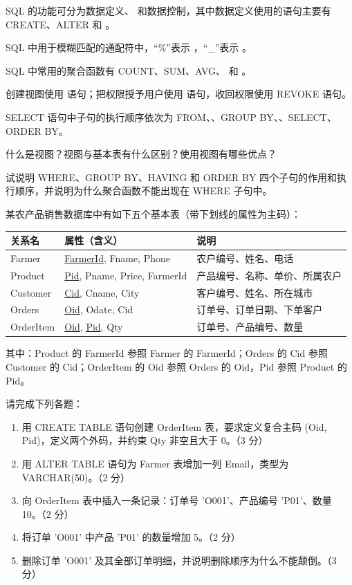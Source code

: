 \documentclass[a4paper,11pt]{article}
\begin{document}
\q SQL 的功能可分为数据定义、\fillblank{} 和数据控制，其中数据定义使用的语句主要有 CREATE、ALTER 和 \fillblank{}。

\q SQL 中用于模糊匹配的通配符中，“\%”表示 \fillblank{}，“\_”表示 \fillblank{}。

\q SQL 中常用的聚合函数有 COUNT、SUM、AVG、\fillblank{} 和 \fillblank{}。

\q 创建视图使用 \fillblank{} 语句；把权限授予用户使用 \fillblank{} 语句，收回权限使用 REVOKE 语句。

\q SELECT 语句中子句的执行顺序依次为 FROM、\fillblank{}、GROUP BY、\fillblank{}、SELECT、ORDER BY。

\q 什么是视图？视图与基本表有什么区别？使用视图有哪些优点？\anslines{2.2cm}

\q 试说明 WHERE、GROUP BY、HAVING 和 ORDER BY 四个子句的作用和执行顺序，并说明为什么聚合函数不能出现在 WHERE 子句中。\anslines{2.2cm}

\q 某农产品销售数据库中有如下五个基本表（带下划线的属性为主码）：
\begin{center}
\small
\begin{tabular}{@{}lll@{}}
\toprule
关系名 & 属性（含义） & 说明 \\
\midrule
Farmer & \underline{FarmerId}, Fname, Phone & 农户编号、姓名、电话 \\
Product & \underline{Pid}, Pname, Price, FarmerId & 产品编号、名称、单价、所属农户 \\
Customer & \underline{Cid}, Cname, City & 客户编号、姓名、所在城市 \\
Orders & \underline{Oid}, Odate, Cid & 订单号、订单日期、下单客户 \\
OrderItem & \underline{Oid}, \underline{Pid}, Qty & 订单号、产品编号、数量 \\
\bottomrule
\end{tabular}
\end{center}

其中：Product 的 FarmerId 参照 Farmer 的 FarmerId；Orders 的 Cid 参照 Customer 的 Cid；OrderItem 的 Oid 参照 Orders 的 Oid，Pid 参照 Product 的 Pid。

请完成下列各题：
\begin{enumerate}[label=（\arabic*）, leftmargin=2.4em, itemsep=1pt]
  \item 用 CREATE TABLE 语句创建 OrderItem 表，要求定义复合主码 (Oid, Pid)，定义两个外码，并约束 Qty 非空且大于 0。（3 分）
  \item 用 ALTER TABLE 语句为 Farmer 表增加一列 Email，类型为 VARCHAR(50)。（2 分）
  \item 向 OrderItem 表中插入一条记录：订单号 'O001'、产品编号 'P01'、数量 10。（2 分）
  \item 将订单 'O001' 中产品 'P01' 的数量增加 5。（2 分）
  \item 删除订单 'O001' 及其全部订单明细，并说明删除顺序为什么不能颠倒。（3 分）
\end{enumerate}
\anslines{4.5cm}
\end{document}
